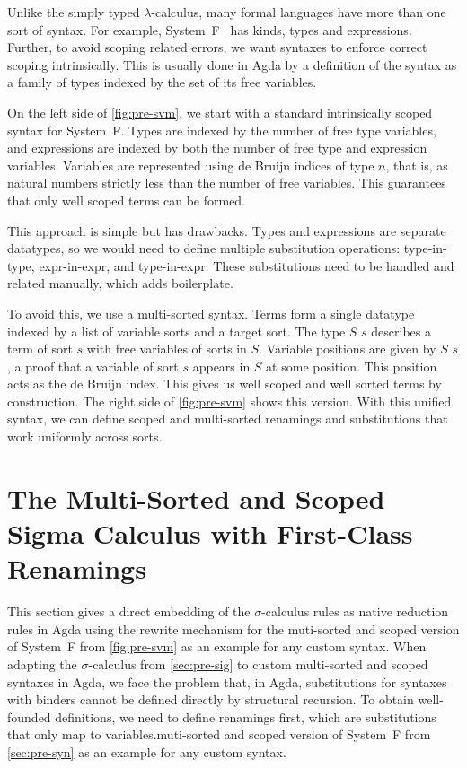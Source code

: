 \documentclass[screen,nonacm]{acmart}
\begin{document}
Unlike the simply typed $\lambda$-calculus, many formal languages have more
than one sort of syntax. For example, System~F~\cite{girard1972} has kinds,
types and expressions. Further, to avoid scoping related errors, we want
syntaxes to enforce correct scoping intrinsically. This is usually done in Agda
by a definition of the syntax as a family of types indexed by the set of its
free variables.

On the left side of \cref{fig:pre-svm}, we start with a standard intrinsically
scoped syntax for System~F. Types are indexed by the number of free type
variables, and expressions are indexed by both the number of free type and
expression variables. Variables are represented using de Bruijn indices of type
 $n$, that is, as natural numbers strictly less than the
number of free variables. This guarantees that only well scoped terms can be
formed.

This approach is simple but has drawbacks. Types and expressions are separate
datatypes, so we would need to define multiple substitution operations:
type-in-type, expr-in-expr, and type-in-expr. These substitutions need to be
handled and related manually, which adds boilerplate.

To avoid this, we use a multi-sorted syntax. Terms form a single datatype
indexed by a list of variable sorts and a target sort. The type $S$
 $s$ describes a term of sort $s$ with free variables of sorts
in $S$. Variable positions are given by $S$  $s$, a proof that
a variable of sort $s$ appears in $S$ at some position. This position acts as
the de Bruijn index. This gives us well scoped and well sorted terms by
construction. The right side of \cref{fig:pre-svm} shows this version. With
this unified syntax, we can define scoped and multi-sorted renamings and
substitutions that work uniformly across sorts.

\section{The Multi-Sorted and Scoped Sigma Calculus with First-Class Renamings}\label{sec:mis}

This section gives a direct embedding of the $\sigma$-calculus rules as native
reduction rules in Agda using the rewrite mechanism for the muti-sorted and
scoped version of System~F from \cref{fig:pre-svm} as an example for any custom
syntax. When adapting the $\sigma$-calculus from \cref{sec:pre-sig} to custom
multi-sorted and scoped syntaxes in Agda, we face the problem that, in Agda,
substitutions for syntaxes with binders cannot be defined directly by
structural recursion. To obtain well-founded definitions, we need to define
renamings first, which are substitutions that only map to variables.muti-sorted
and scoped version of System~F from \cref{sec:pre-syn} as an example for any
custom syntax.
\end{document}
